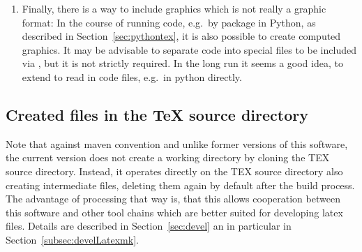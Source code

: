 \begin{enumerate}
The fourth kind of graphics formats 
has to be transformed into one of the kinds one or two 
but unlike in type three, this is not done explicitly 
by an external tool but by a latex-package during the \LaTeX-run. 
Note that, although not required to be explicitly transformed, 
those graphics files induce additional files 
by running \LaTeX.
Essentially, each of the abovementioned type of format
can be included that way but currently,
this is done for the \gls{svg}-format only
included by the package  (see~\cite{SvgP}).
The author personally refrains from using packages like that
because of the lack of flexibility and further drawbacks. 
\item 
Finally, there is a way to include graphics which is not really a graphic format: 
In the course of running code, e.g.~by package  in Python, 
as described in Section~\ref{sec:pythontex}, 
it is also possible to create computed graphics. 
It may be advisable to separate code into special files to be included via , 
but it is not strictly required. 
In the long run it seems a good idea, to extend  
to read in code files, e.g.~in python directly. 
\end{enumerate}




\subsection{Created files in the \TeX{} source directory}\label{subsec:sourceCreated}

Note that against maven convention and unlike former versions of this software, 
the current version does not create a working directory 
by cloning the TEX source directory. 
Instead, it operates directly on the TEX source directory 
also creating intermediate files, 
deleting them again by default after the build process.
The advantage of processing that way is,
that this allows cooperation between this software
and other tool chains which are better suited for developing latex files.
Details are described in Section~\ref{sec:devel} an in particular in Section~\ref{subsec:develLatexmk}.

